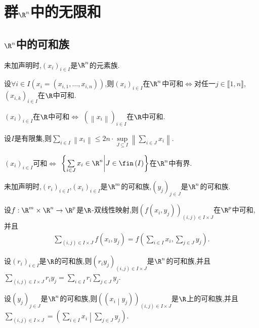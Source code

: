 \chapter{群\texorpdfstring{$\R^{n}$}{Rn}中的无限和}

\section{\texorpdfstring{$\R^{n}$}{Rn}中的可和族}

未加声明时,$\left(x_{i}\right)_{i\in I}$是$\R^{n}$的元素族.

\begin{proposition}{}{}
	设$\forall i\in I\left(x_{i}=\left(x_{i,1},\ldots,x_{i,n}\right)\right)$,则$\left(x_{i}\right)_{i\in I}$在$\R^{n}$中可和$\iff$对任一$j\in\llbracket 1,n\rrbracket$,$\left(x_{i,k}\right)_{i\in I}$在$\R$中可和.
\end{proposition}

\begin{theorem}{}{}
	$\left(x_{i}\right)_{i\in I}$在$\R$中可和$\iff$ $\left(\left\|x_{i}\right\|\right)_{i\in I}$在$\R$中可和.
\end{theorem}

\begin{proposition}{}{}
	设$I$是有限集,则$\sum\limits_{i\in I}\left\|x_{i}\right\|\leqslant 2n\cdot\sup\limits_{J\subseteq I}\left\|\sum\limits_{i\in J}x_{i}\right\|$.
\end{proposition}

\begin{corollary}{}{}
	$\left(x_{i}\right)_{i\in I}$可和$\iff$ $\left\{\sum\limits_{i\in J}x_{i}\in\R^{n}\middle|J\in\fin\left(I\right)\right\}$在$\R^{n}$中有界.
\end{corollary}

未加声明时,$\left(r_{i}\right)_{i\in I}$,$\left(x_{i}\right)_{i\in I}$是$\R^{m}$的可和族,$\left(y_{j}\right)_{j\in J}$是$\R^{n}$的可和族.

\begin{proposition}{}{}
	设$f:\R^{m}\times\R^{n}\to\R^{p}$是$\R$-双线性映射,则$\left(f\left(x_{i},y_{j}\right)\right)_{\left(i,j\right)\in I\times J}$在$\R^{p}$中可和,并且
	\begin{align*}
		\sum\limits_{\left(i,j\right)\in I\times J}f\left(x_{i},y_{j}\right)=f\left(\sum\limits_{i\in I}x_{i},\sum\limits_{j\in J}y_{j}\right).
	\end{align*}
\end{proposition}

\begin{corollary}{}{}
	设$\left(r_{i}\right)_{i\in I}$是$\R$的可和族,则$\left(r_{i}y_{j}\right)_{\left(i,j\right)\in I\times J}$是$\R^{n}$的可和族,并且$\sum\limits_{\left(i,j\right)\in I\times J}r_{i}y_{j}=\sum\limits_{i\in I}r_{i}\sum\limits_{j\in J}y_{j}$.
\end{corollary}

\begin{corollary}{}{}
	设$\left(y_{j}\right)_{j\in J}$是$\R^{n}$的可和族,则$\left(\left(x_{i}\middle|y_{j}\right)\right)_{\left(i,j\right)\in I\times J}$是$\R$上的可和族,并且$\sum\limits_{\left(i,j\right)\in I\times J}=\left(\sum\limits_{i\in I}x_{i}\middle|\sum\limits_{j\in J}y_{j}\right)$.
\end{corollary}